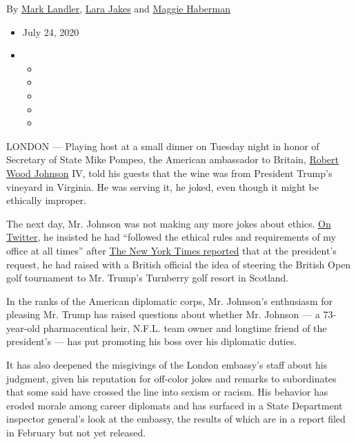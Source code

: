 By \href{https://www.nytimes.com/by/mark-landler}{Mark Landler},
\href{https://www.nytimes.com/by/lara-jakes}{Lara Jakes} and
\href{https://www.nytimes.com/by/maggie-haberman}{Maggie Haberman}

\begin{itemize}
\item
  July 24, 2020
\item
  \begin{itemize}
  \item
  \item
  \item
  \item
  \item
  \end{itemize}
\end{itemize}

LONDON --- Playing host at a small dinner on Tuesday night in honor of
Secretary of State Mike Pompeo, the American ambassador to Britain,
\href{https://www.nytimes.com/2020/07/25/sports/football/woody-johnson-trump-jets.html}{Robert
Wood Johnson} IV, told his guests that the wine was from President
Trump's vineyard in Virginia. He was serving it, he joked, even though
it might be ethically improper.

The next day, Mr. Johnson was not making any more jokes about ethics.
\href{https://twitter.com/USAmbUK/status/1286029006500966402?s=20}{On
Twitter}, he insisted he had ``followed the ethical rules and
requirements of my office at all times'' after
\href{https://www.nytimes.com/2020/07/21/world/europe/trump-british-open.html}{The
New York Times reported} that at the president's request, he had raised
with a British official the idea of steering the British Open golf
tournament to Mr. Trump's Turnberry golf resort in Scotland.

In the ranks of the American diplomatic corps, Mr. Johnson's enthusiasm
for pleasing Mr. Trump has raised questions about whether Mr. Johnson
--- a 73-year-old pharmaceutical heir, N.F.L. team owner and longtime
friend of the president's --- has put promoting his boss over his
diplomatic duties.

It has also deepened the misgivings of the London embassy's staff about
his judgment, given his reputation for off-color jokes and remarks to
subordinates that some said have crossed the line into sexism or racism.
His behavior has eroded morale among career diplomats and has surfaced
in a State Department inspector general's look at the embassy, the
results of which are in a report filed in February but not yet released.

